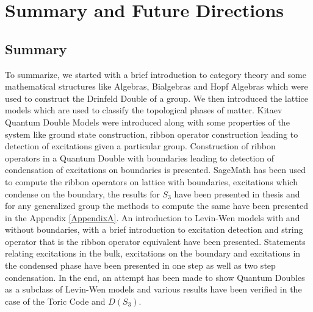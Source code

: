 
\chapter{Summary and Future Directions} %

\label{Chapter5} %


\section{Summary}
      To summarize, we started with a brief introduction to category theory and some mathematical structures like Algebras, Bialgebras and Hopf Algebras which were used to construct the 
Drinfeld Double of a group. We then introduced the lattice models which are used to classify the topological phases of matter. Kitaev Quantum Double Models were introduced along with some
properties of the system like ground state construction, ribbon operator construction leading to detection of excitations given a particular group. Construction of ribbon operators in a Quantum 
Double with boundaries leading to detection of condensation of excitations on boundaries is presented. SageMath \citep{Reference9} has been used to compute the ribbon operators on lattice with boundaries, excitations
which condense on the boundary, the results for $S_{3}$ have been presented in thesis and for any generalized group the methods to compute the same have been presented in the Appendix \ref{AppendixA}. An introduction
to Levin-Wen models with and without boundaries, with a brief introduction to excitation detection and string operator that is the ribbon operator equivalent have been presented. Statements relating excitations in 
the bulk, excitations on the boundary and excitations in the condensed phase have been presented in one step as well as two step condensation. In the end, an attempt has been made to show Quantum Doubles
as a subclass of Levin-Wen models and various results have been verified in the case of the Toric Code and $D(S_{3})$.  
\pagebreak
